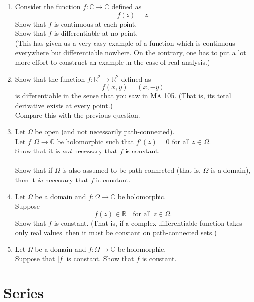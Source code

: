 \documentclass[12pt]{article}
\theoremstyle{definition}
\numberwithin{thm}{section}
\begin{document}
\begin{enumerate}
	\item Consider the function $f:\mathbb{C} \to \mathbb{C}$ defined as
	\begin{equation*} 
		f(z) = \bar{z}.
	\end{equation*}
	Show that $f$ is continuous at each point.\\
	Show that $f$ is differentiable at no point.\\
	(This has given us a very easy example of a function which is continuous everywhere but differentiable nowhere. On the contrary, one has to put a lot more effort to construct an example in the case of real analysis.)
	\item Show that the function $f:\mathbb{R}^2\to\mathbb{R}^2$ defined as
	\begin{equation*} 
		f(x, y) = (x, -y)
	\end{equation*}
	is differentiable in the sense that you saw in MA 105. (That is, its total derivative exists at every point.)\\
	Compare this with the previous question.
	\item Let $\Omega$ be open (and not necessarily path-connected). \\
	Let $f:\Omega \to \mathbb{C}$ be holomorphic such that $f'(z) = 0$ for all $z \in \Omega.$\\
	Show that it is \emph{not} necessary that $f$ is constant.\\~\\
	Show that if $\Omega$ is also assumed to be path-connected (that is, $\Omega$ is a domain), then it \emph{is} necessary that $f$ is constant.
	\item Let $\Omega$ be a domain and $f:\Omega \to \mathbb{C}$ be holomorphic.\\
	Suppose
	\begin{equation*} 
		f(z) \in \mathbb{R} \quad \text{for all } z \in \Omega.
	\end{equation*}
	Show that $f$ is constant. (That is, if a complex differentiable function takes only real values, then it must be constant on path-connected sets.)
	\item Let $\Omega$ be a domain and $f:\Omega \to \mathbb{C}$ be holomorphic.\\
	Suppose that $|f|$ is constant. Show that $f$ is constant.
\end{enumerate}
\newpage\section{Series}
\end{document}
